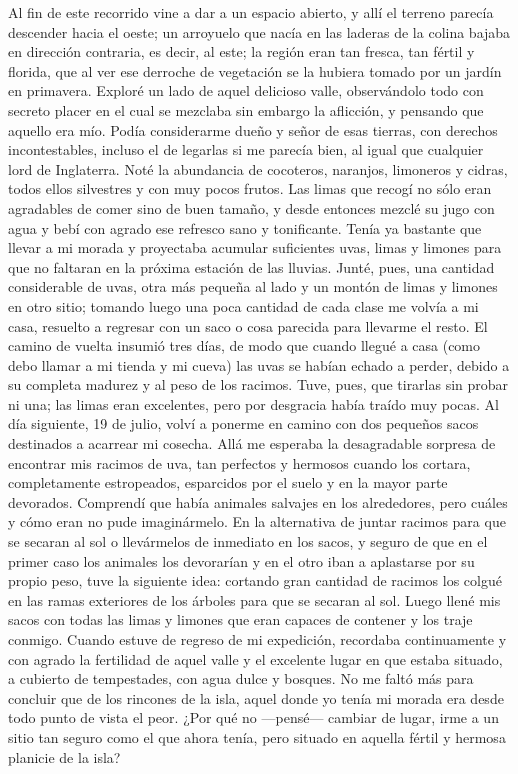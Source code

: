 \documentclass{novela}
\begin{document}
    Al fin de este recorrido vine a dar a un espacio abierto, y allí el terreno parecía descender hacia el oeste; un arroyuelo que nacía en las laderas de la colina bajaba en dirección contraria, es decir, al este; la región eran tan fresca, tan fértil y florida, que al ver ese derroche de vegetación se la hubiera tomado por un jardín en primavera.
    Exploré un lado de aquel delicioso valle, observándolo todo con secreto placer en el cual se mezclaba sin embargo la aflicción, y pensando que aquello era mío. Podía considerarme dueño y señor de esas tierras, con derechos incontestables, incluso el de legarlas si me parecía bien, al igual que cualquier lord de Inglaterra. Noté la abundancia de cocoteros, naranjos, limoneros y cidras, todos ellos silvestres y con muy pocos frutos. Las limas que recogí no sólo eran agradables de comer sino de buen tamaño, y desde entonces mezclé su jugo con agua y bebí con agrado ese refresco sano y tonificante.
    Tenía ya bastante que llevar a mi morada y proyectaba acumular suficientes uvas, limas y limones para que no faltaran en la próxima estación de las lluvias. Junté, pues, una cantidad considerable de uvas, otra más pequeña al lado y un montón de limas y limones en otro sitio; tomando luego una poca cantidad de cada clase me volvía a mi casa, resuelto a regresar con un saco o cosa parecida para llevarme el resto.
    El camino de vuelta insumió tres días, de modo que cuando llegué a casa (como debo llamar a mi tienda y mi cueva) las uvas se habían echado a perder, debido a su completa madurez y al peso de los racimos. Tuve, pues, que tirarlas sin probar ni una; las limas eran excelentes, pero por desgracia había traído muy pocas.
    Al día siguiente, 19 de julio, volví a ponerme en camino con dos pequeños sacos destinados a acarrear mi cosecha. Allá me esperaba la desagradable sorpresa de encontrar mis racimos de uva, tan perfectos y hermosos cuando los cortara, completamente estropeados, esparcidos por el suelo y en la mayor parte devorados. Comprendí que había animales salvajes en los alrededores, pero cuáles y cómo eran no pude imaginármelo.
    En la alternativa de juntar racimos para que se secaran al sol o llevármelos de inmediato en los sacos, y seguro de que en el primer caso los animales los devorarían y en el otro iban a aplastarse por su propio peso, tuve la siguiente idea: cortando gran cantidad de racimos los colgué en las ramas exteriores de los árboles para que se secaran al sol. Luego llené mis sacos con todas las limas y limones que eran capaces de contener y los traje conmigo.
    Cuando estuve de regreso de mi expedición, recordaba continuamente y con agrado la fertilidad de aquel valle y el excelente lugar en que estaba situado, a cubierto de tempestades, con agua dulce y bosques. No me faltó más para concluir que de los rincones de la isla, aquel donde yo tenía mi morada era desde todo punto de vista el peor. ¿Por qué no —pensé— cambiar de lugar, irme a un sitio tan seguro como el que ahora tenía, pero situado en aquella fértil y hermosa planicie de la isla?
\end{document}
